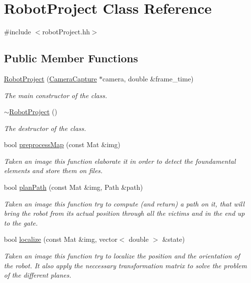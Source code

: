 \hypertarget{class_robot_project}{}\section{Robot\+Project Class Reference}
\label{class_robot_project}


{\ttfamily \#include $<$robot\+Project.\+hh$>$}

\subsection*{Public Member Functions}
\begin{DoxyCompactItemize}
\item 
\mbox{\hyperlink{class_robot_project_a3afaaa8731fb02fabaf2c47bb7c81799}{Robot\+Project}} (\mbox{\hyperlink{class_camera_capture}{Camera\+Capture}} $\ast$camera, double \&frame\+\_\+time)
\begin{DoxyCompactList}\small\item\em The main constructor of the class. \end{DoxyCompactList}\item 
\mbox{\hyperlink{class_robot_project_a8510ebe175da3b90ffea7c88b690b4f8}{$\sim$\+Robot\+Project}} ()
\begin{DoxyCompactList}\small\item\em The destructor of the class. \end{DoxyCompactList}\item 
bool \mbox{\hyperlink{class_robot_project_a380adb448f0fcbc625df9401de3bb013}{preprocess\+Map}} (const Mat \&img)
\begin{DoxyCompactList}\small\item\em Taken an image this function elaborate it in order to detect the foundamental elements and store them on files. \end{DoxyCompactList}\item 
bool \mbox{\hyperlink{class_robot_project_ad9077931a89d2226e6675c6107adfc53}{plan\+Path}} (const Mat \&img, Path \&path)
\begin{DoxyCompactList}\small\item\em Taken an image this function try to compute (and return) a path on it, that will bring the robot from its actual position through all the victims and in the end up to the gate. \end{DoxyCompactList}\item 
bool \mbox{\hyperlink{class_robot_project_a9899c66898ccd1b638fe074797a18398}{localize}} (const Mat \&img, vector$<$ double $>$ \&state)
\begin{DoxyCompactList}\small\item\em Taken an image this function try to localize the position and the orientation of the robot. It also apply the neccessary transformation matrix to solve the problem of the different planes. \end{DoxyCompactList}\end{DoxyCompactItemize}


